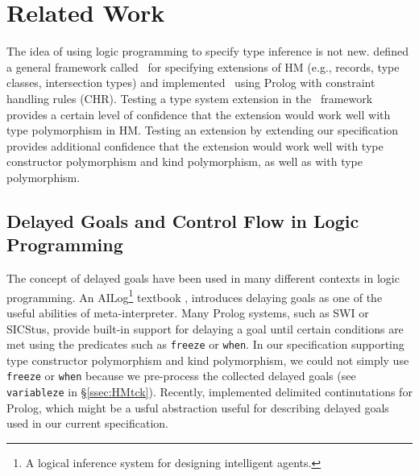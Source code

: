 \section{Related Work}\label{sec:relwork}
The idea of using logic programming to specify type inference is not new.
\citet*{HMX99} defined a general framework called \HMX\ for specifying
extensions of HM (e.g., records, type classes, intersection types)
and \citet{tyinferCHR02} implemented \HMX\ using Prolog with
constraint handling rules (CHR). Testing a type system extension
in the \HMX\ framework provides a certain level of confidence that the extension
would work well with type polymorphism in HM. Testing an extension by
extending our specification provides additional confidence that the extension
would work well with type constructor polymorphism and kind polymorphism,
as well as with type polymorphism.

\subsection{Delayed Goals and Control Flow in Logic Programming}
The concept of delayed goals have been used in many different contexts
in logic programming. An AILog\footnote{A logical inference system for designing
	 intelligent agents.} textbook \cite{AILogTextBook},
introduces delaying goals as one of the useful abilities of meta-interpreter.
Many Prolog systems, such as SWI or SICStus, provide built-in support for
delaying a goal until certain conditions are met using the predicates
such as \verb|freeze| or \verb|when|. In our specification supporting
type constructor polymorphism and kind polymorphism, we could not
simply use \verb|freeze| or \verb|when| because we pre-process
the collected delayed goals (see \verb|variableze| in \S\ref{ssec:HMtck}).
Recently, \citet{SchDemDesWei13} implemented delimited continutations for Prolog,
which might be a usful abstraction useful for describing delayed goals used in
our current specification.


